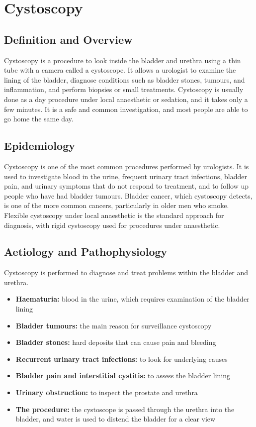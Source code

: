 \chapter{Cystoscopy}

\section*{Definition and Overview}
Cystoscopy is a procedure to look inside the bladder and urethra using a thin tube with a camera called a cystoscope. It allows a urologist to examine the lining of the bladder, diagnose conditions such as bladder stones, tumours, and inflammation, and perform biopsies or small treatments. Cystoscopy is usually done as a day procedure under local anaesthetic or sedation, and it takes only a few minutes. It is a safe and common investigation, and most people are able to go home the same day.

\section*{Epidemiology}
Cystoscopy is one of the most common procedures performed by urologists. It is used to investigate blood in the urine, frequent urinary tract infections, bladder pain, and urinary symptoms that do not respond to treatment, and to follow up people who have had bladder tumours. Bladder cancer, which cystoscopy detects, is one of the more common cancers, particularly in older men who smoke. Flexible cystoscopy under local anaesthetic is the standard approach for diagnosis, with rigid cystoscopy used for procedures under anaesthetic.

\section*{Aetiology and Pathophysiology}
Cystoscopy is performed to diagnose and treat problems within the bladder and urethra.

\begin{itemize}
    \item \textbf{Haematuria:} blood in the urine, which requires examination of the bladder lining
    \item \textbf{Bladder tumours:} the main reason for surveillance cystoscopy
    \item \textbf{Bladder stones:} hard deposits that can cause pain and bleeding
    \item \textbf{Recurrent urinary tract infections:} to look for underlying causes
    \item \textbf{Bladder pain and interstitial cystitis:} to assess the bladder lining
    \item \textbf{Urinary obstruction:} to inspect the prostate and urethra
    \item \textbf{The procedure:} the cystoscope is passed through the urethra into the bladder, and water is used to distend the bladder for a clear view
\end{itemize}

